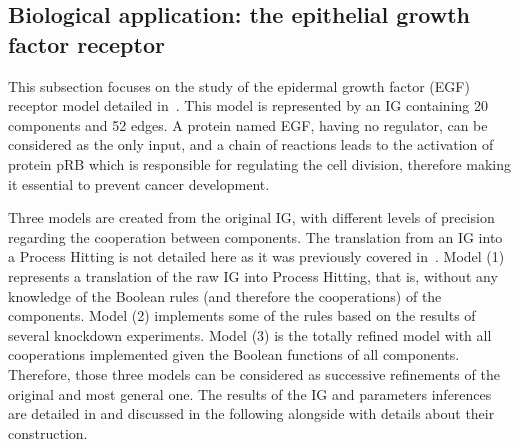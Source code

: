 



\subsection{Biological application: the epithelial growth factor receptor}\label{ssec:appli}

This subsection focuses on the study of the epidermal growth factor (EGF) receptor model detailed in~\cite{Sahin09}.
This model is represented by an IG containing 20 components and 52 edges.
A protein named EGF, having no regulator, can be considered as the only input,
and a chain of reactions leads to the activation of protein pRB which is responsible for regulating the cell division,
therefore making it essential to prevent cancer development.

Three models are created from the original IG, with different levels of precision regarding the cooperation between components.
The translation from an IG into a Process Hitting is not detailed here as it was previously covered in~\cite{PMR10-TCSB}.
Model (1) represents a translation of the raw IG into Process Hitting, that is,
without any knowledge of the Boolean rules (and therefore the cooperations) of the components.
Model (2) implements some of the rules based on the results of several knockdown experiments.
Model (3) is the totally refined model with all cooperations implemented given the Boolean functions of all components.
Therefore, those three models can be considered as successive refinements of the original and most general one.
The results of the IG and parameters inferences are detailed in 
and discussed in the following alongside with details about their construction.

